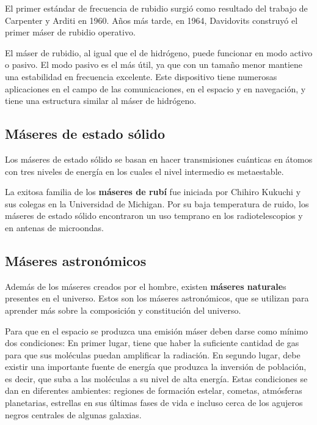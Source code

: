 El primer est\'andar de frecuencia de rubidio surgi\'o como resultado del trabajo de Carpenter y Arditi en 1960. A\~nos m\'as tarde, en 1964, Davidovits construy\'o el primer m\'aser de rubidio operativo.

El m\'aser de rubidio, al igual que el de hidr\'ogeno, puede funcionar en modo activo o pasivo. El modo pasivo es el m\'as \'util, ya que con un tama\~no menor mantiene una estabilidad en frecuencia excelente. Este dispositivo tiene numerosas aplicaciones en el campo de las comunicaciones, en el espacio y en navegaci\'on, y tiene una estructura similar al m\'aser de hidr\'ogeno.

\subsection{M\'aseres de estado s\'olido}

Los m\'aseres de estado s\'olido \cite{historiaFisica} se basan en hacer transmisiones cu\'anticas en \'atomos con tres niveles de energ\'ia en los cuales el nivel intermedio es metaestable.

La exitosa familia de los\textbf{ m\'aseres de rub\'i} fue iniciada por Chihiro Kukuchi y sus colegas en la Universidad de Michigan. Por su baja temperatura de ruido, los m\'aseres de estado s\'olido encontraron un uso temprano en los radiotelescopios y en antenas de microondas.

\subsection{M\'aseres astron\'omicos}

Adem\'as de los m\'aseres creados por el hombre, existen \textbf{m\'aseres naturale}s presentes en el universo. Estos son los m\'aseres astron\'omicos, que se utilizan para aprender m\'as sobre la composici\'on y constituci\'on del universo. 

Para que en el espacio se produzca una emisi\'on m\'aser \cite{maserEspacio} deben darse como m\'inimo dos condiciones: En primer lugar, tiene que haber la suficiente cantidad de gas para que sus mol\'eculas puedan amplificar la radiaci\'on. En segundo lugar, debe existir una importante fuente de energ\'ia que produzca la inversi\'on de poblaci\'on, es decir, que suba a las mol\'eculas a su nivel de alta energ\'ia. Estas condiciones se dan en diferentes ambientes: regiones de formaci\'on estelar, cometas, atm\'osferas planetarias, estrellas en sus \'ultimas fases de vida e incluso cerca de los agujeros negros centrales de algunas galaxias.

